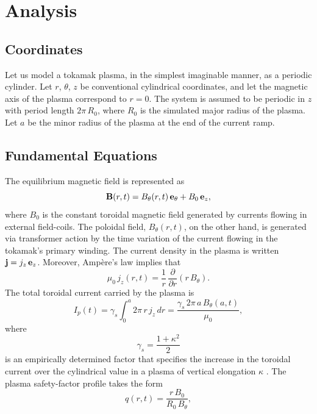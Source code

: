 \documentclass{iopjournal}
\providecommand{\DIFaddend}{} %
\DeclareRobustCommand{\DIFaddend}{\DIFOaddend \let\includegraphics\DIFOincludegraphics} %
\begin{document}
\DIFaddend \section{Analysis}
\subsection{Coordinates}
Let us model a tokamak plasma, in the simplest imaginable manner, as a periodic cylinder. Let $r$, $\theta$, $z$ be conventional cylindrical coordinates, and
let the magnetic axis of the plasma correspond to $r=0$. The system is assumed to be periodic in $z$ with period length $2\pi\,R_0$, where $R_0$ is the
simulated major radius of the plasma. Let $a$ be the minor radius of the plasma at the end of the current ramp. 

\subsection{Fundamental Equations}
The equilibrium magnetic field is represented as
\begin{equation}
{\bf B}(r,t) = B_\theta(r,t)\,{\bf e}_\theta+ B_0\,{\bf e}_z,
\end{equation}
where $B_0$ is the constant toroidal magnetic field generated by  currents flowing in external  field-coils. The poloidal field, $B_\theta(r,t)$, on the other hand, is generated
via transformer action by the time variation of the current flowing in the tokamak's primary winding. The current density in the plasma is written ${\bf j}= j_z\,{\bf e}_z$. Moreover, Amp\`{e}re's law implies that
\begin{equation}
\mu_0\,j_z(r,t) = \frac{1}{r}\,\frac{\partial}{\partial r}(r\,B_\theta).
\end{equation}
The total toroidal current carried by the plasma is
\begin{equation}\label{ei}
I_p(t)= \gamma_s\int_0^a 2\pi\,r\,j_z\,dr = \frac{\gamma_s\,2\pi\,a\,B_\theta(a,t)}{\mu_0},
\end{equation}
where
\begin{equation}
\gamma_s = \frac{1+\kappa^2}{2}
\end{equation}
is an empirically determined factor that specifies the increase in the toroidal current over the cylindrical value in a plasma of vertical elongation $\kappa$ \cite{creely,uckam}.
The plasma safety-factor profile takes the form 
\begin{equation}
q(r,t) = \frac{r\,B_0}{R_0\,B_\theta},
\end{equation}
\end{document}
